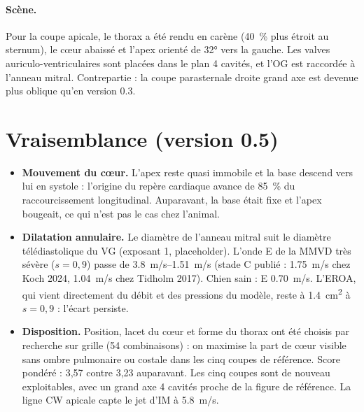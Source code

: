 \documentclass[10pt,a4paper]{article}
\begin{document}
\paragraph{Scène.} Pour la coupe apicale, le thorax a été rendu en carène (40~\% plus étroit au sternum), le cœur
abaissé et l'apex orienté de 32° vers la gauche. Les valves auriculo-ventriculaires sont placées dans le plan
4 cavités, et l'OG est raccordée à l'anneau mitral. Contrepartie : la coupe parasternale droite grand axe est devenue
plus oblique qu'en version 0.3.

\section{Vraisemblance (version 0.5)}
\begin{itemize}
\item \textbf{Mouvement du cœur.} L'apex reste quasi immobile et la base descend vers lui en systole : l'origine du repère
cardiaque avance de 85~\% du raccourcissement longitudinal. Auparavant, la base était fixe et l'apex bougeait, ce qui
n'est pas le cas chez l'animal.
\item \textbf{Dilatation annulaire.} Le diamètre de l'anneau mitral suit le diamètre télédiastolique du VG
(exposant 1, placeholder). L'onde E de la MMVD très sévère ($s=0{,}9$) passe de \SIrange{3,8}{1,51}{m/s} (stade C publié :
\SI{1,75}{m/s} chez Koch 2024, \SI{1,04}{m/s} chez Tidholm 2017). Chien sain : E \SI{0,70}{m/s}. L'EROA, qui vient
directement du débit et des pressions du modèle, reste à \SI{1,4}{cm^2} à $s=0{,}9$ : l'écart persiste.
\item \textbf{Disposition.} Position, lacet du cœur et forme du thorax ont été choisis par recherche sur grille
(54 combinaisons) : on maximise la part de cœur visible sans ombre pulmonaire ou costale dans les cinq coupes de
référence. Score pondéré : 3,57 contre 3,23 auparavant. Les cinq coupes sont de nouveau exploitables, avec un grand axe
4 cavités proche de la figure de référence. La ligne CW apicale capte le jet d'IM à \SI{5,8}{m/s}.
\end{itemize}
\end{document}
